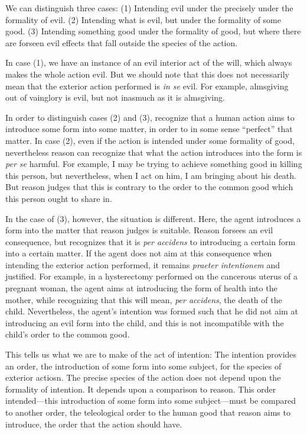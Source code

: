 \documentclass{article}
\begin{document}
We can distinguish three cases:  (1) Intending evil under the precisely under the formality of evil.  (2) Intending what
is evil, but under the formality of some good.  (3) Intending something good under the formality of good, but where
there are forseen evil effects that fall outside the species of the action.

In case (1), we have an instance of an evil interior act of the will, which always makes the whole action evil.  But we
should note that this does not necessarily mean that the exterior action performed is \emph{in se} evil.  For example,
almsgiving out of vainglory is evil, but not inasmuch as it is almsgiving.

In order to distinguish cases (2) and (3), recognize that a human action aims to introduce some form into some matter,
in order to in some sense ``perfect'' that matter.  In case (2), even if the action is intended under some formality of
good, nevertheless reason can recognize that what the action introduces into the form is \emph{per se} harmful.  For
example, I may be trying to achieve something good in killing this person, but nevertheless, when I act on him, I am
bringing about his death.  But reason judges that this is contrary to the order to the common good which this person
ought to share in.

In the case of (3), however, the situation is different. Here, the agent introduces a form into the matter that reason
judges is suitable.  Reason forsees an evil consequence, but recognizes that it is \emph{per accidens} to introducing a
certain form into a certain matter.  If the agent does not aim at this consequence when intending the exterior action
performed, it remains \emph{praeter intentionem} and justified.  For example, in a hysterectomy performed on the
cancerous uterus of a pregnant woman, the agent aims at introducing the form of health into the mother, while
recognizing that this will mean, \emph{per accidens}, the death of the child.  Nevertheless, the agent's intention was
formed such that he did not aim at introducing an evil form into the child, and this is not incompatible with the
child's order to the common good.

This tells us what we are to make of the act of intention:  The intention provides an order, the introduction of some
form into some subject, for the species of exterior actiosn.  The precise species of the action does not depend upon the
formality of intention.  It depends upon a comparison to reason.  This order intended---this introduction of some form
into some subject---must be compared to another order, the teleological order to the human good that reason aims to
introduce, the order that the action should have.  
\end{document}
